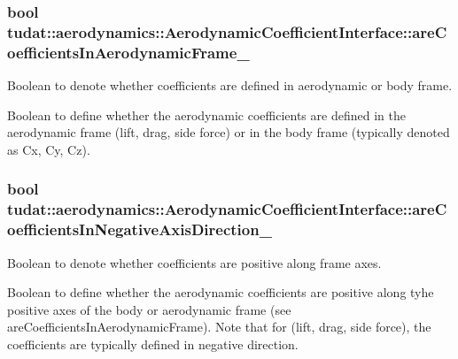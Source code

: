 \subsubsection[{\texorpdfstring{are\+Coefficients\+In\+Aerodynamic\+Frame\+\_\+}{areCoefficientsInAerodynamicFrame_}}]{\setlength{\rightskip}{0pt plus 5cm}bool tudat\+::aerodynamics\+::\+Aerodynamic\+Coefficient\+Interface\+::are\+Coefficients\+In\+Aerodynamic\+Frame\+\_\+\hspace{0.3cm}{\ttfamily [protected]}}\hypertarget{classtudat_1_1aerodynamics_1_1AerodynamicCoefficientInterface_a29e32be7cec1045dba10c7a60182ad05}{}\label{classtudat_1_1aerodynamics_1_1AerodynamicCoefficientInterface_a29e32be7cec1045dba10c7a60182ad05}


Boolean to denote whether coefficients are defined in aerodynamic or body frame. 

Boolean to define whether the aerodynamic coefficients are defined in the aerodynamic frame (lift, drag, side force) or in the body frame (typically denoted as Cx, Cy, Cz). 
\subsubsection[{\texorpdfstring{are\+Coefficients\+In\+Negative\+Axis\+Direction\+\_\+}{areCoefficientsInNegativeAxisDirection_}}]{\setlength{\rightskip}{0pt plus 5cm}bool tudat\+::aerodynamics\+::\+Aerodynamic\+Coefficient\+Interface\+::are\+Coefficients\+In\+Negative\+Axis\+Direction\+\_\+\hspace{0.3cm}{\ttfamily [protected]}}\hypertarget{classtudat_1_1aerodynamics_1_1AerodynamicCoefficientInterface_a6ede4ceff6ef3a4eb91e4061750e5c19}{}\label{classtudat_1_1aerodynamics_1_1AerodynamicCoefficientInterface_a6ede4ceff6ef3a4eb91e4061750e5c19}


Boolean to denote whether coefficients are positive along frame axes. 

Boolean to define whether the aerodynamic coefficients are positive along tyhe positive axes of the body or aerodynamic frame (see are\+Coefficients\+In\+Aerodynamic\+Frame). Note that for (lift, drag, side force), the coefficients are typically defined in negative direction. 

